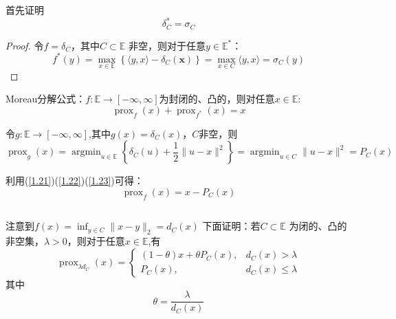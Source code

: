 \documentclass[fontset=mac]{ctexart}
\begin{document}
	首先证明
	\begin{equation}
		\delta_C^* = \sigma_C  \label{1.21}
	\end{equation}

	\begin{proof}
		令$f = \delta_C$，其中$C \subset \mathbb{E}$ 非空，则对于任意$y \in \mathbb{E}^*$：
		$$
		f^{*}({y})=\max _{{x} \in \mathbb{E}}\left\{\langle{y}, {x}\rangle-\delta_{C}(\mathbf{x})\right\}=\max _{{x} \in C}\langle{y}, {x}\rangle=\sigma_{C}({y})
		$$
	\end{proof}
	
	Moreau分解公式：$f: \mathbb{E} \to [-\infty, \infty]$为封闭的、凸的，则对任意$x \in \mathbb{E}$:
	\begin{equation}
	\operatorname{prox}_{ f}({x})+ \operatorname{prox}_{ f^{*}}({x})={x} \label{1.22}
	\end{equation}
	
	令$g:\mathbb{E} \to [-\infty, \infty]$,其中$g(x)=\delta_{C}(x)$，$C$非空，则
	\begin{equation}
	\operatorname{prox}_{g}({x})=\operatorname{argmin}_{{u} \in \mathbb{E}}\left\{\delta_{C}({u})+\frac{1}{2}\|{u}-{x}\|^{2}\right\}=\operatorname{argmin}_{{u} \in C}\|{u}-{x}\|^{2}=P_{C}({x}) \label{1.23}
	\end{equation}
	
	利用(\ref{1.21})(\ref{1.22})(\ref{1.23})可得：
	$$
	\operatorname{prox}_f(x) = x - P_C(x)
	$$
	
	\newpage
	\subsection{}
	注意到$f(x)=\inf _{y \in C}\|x-y\|_{2} = d_C(x)$
	下面证明：若$C \subset \mathbb{E}$ 为闭的、凸的非空集，$\lambda > 0$，则对于任意$x \in \mathbb{E}$,有
	\begin{equation}
		\operatorname{prox}_{\lambda d_{C}}({x})=\left\{\begin{array}{ll}
			(1-\theta) {x}+\theta P_{C}({x}), & d_{C}({x})>\lambda \\
			P_{C}({x}), & d_{C}({x}) \leq \lambda
		\end{array}\right.
	\end{equation}
	其中
	\begin{equation}
		\theta = \frac{\lambda}{d_C(x)} \label{6.33}
	\end{equation}
\end{document}
